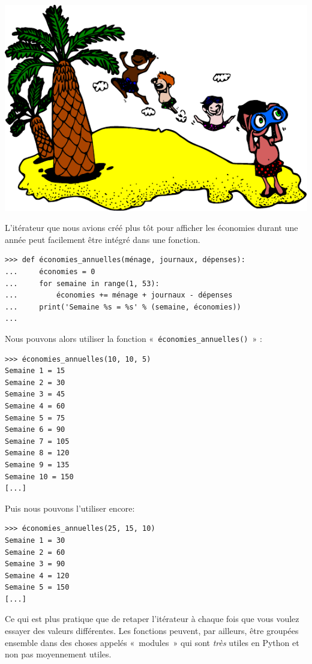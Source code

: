 \begin{center}
 \includegraphics{images/ile.pdf}
\end{center}

L'itérateur que nous avions créé plus tôt pour afficher les économies durant une année peut facilement être intégré dans une fonction.

\begin{Verbatim}[frame=single,rulecolor=\color{mbleu}, label=à taper]
>>> def économies_annuelles(ménage, journaux, dépenses):
...     économies = 0
...     for semaine in range(1, 53):
...         économies += ménage + journaux - dépenses
...     print('Semaine %s = %s' % (semaine, économies))
...
\end{Verbatim}

Nous pouvons alors utiliser la fonction «~\texttt{économies\_annuelles()}~» :

\begin{Verbatim}[frame=single,rulecolor=\color{mbleu}, label=à taper]
>>> économies_annuelles(10, 10, 5)
Semaine 1 = 15
Semaine 2 = 30
Semaine 3 = 45
Semaine 4 = 60
Semaine 5 = 75
Semaine 6 = 90
Semaine 7 = 105
Semaine 8 = 120
Semaine 9 = 135
Semaine 10 = 150
[...]
\end{Verbatim}

Puis nous pouvons l'utiliser encore:

\begin{Verbatim}[frame=single,rulecolor=\color{mbleu}, label=à taper]
>>> économies_annuelles(25, 15, 10)
Semaine 1 = 30
Semaine 2 = 60
Semaine 3 = 90
Semaine 4 = 120
Semaine 5 = 150
[...]
\end{Verbatim}

Ce qui est plus pratique que de retaper l'itérateur à chaque fois que vous voulez essayer des valeurs différentes.
Les fonctions peuvent, par ailleurs, être groupées ensemble dans des choses appelés «~modules~»  qui sont \emph{très} utiles en Python et non pas moyennement utiles.\\

